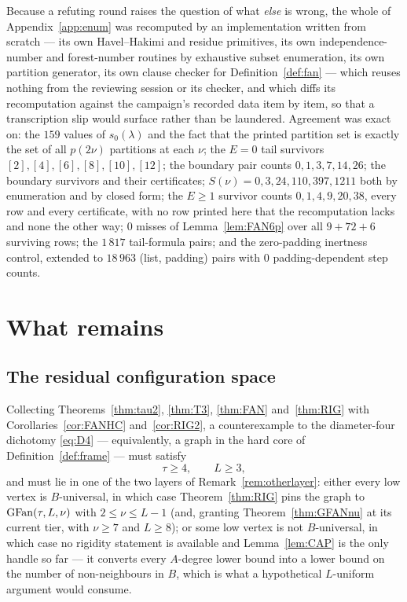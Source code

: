 \begin{remark}\label{rem:thirdtime}
Because a refuting round raises the question of what \emph{else} is wrong, the whole of
Appendix~\ref{app:enum} was recomputed by an implementation written from scratch --- its own
Havel--Hakimi and residue primitives, its own independence-number and forest-number routines
by exhaustive subset enumeration, its own partition generator, its own clause checker for
Definition~\ref{def:fan} --- which reuses nothing from the reviewing session or its checker,
and which diffs its recomputation against the campaign's recorded data item by item, so that
a transcription slip would surface rather than be laundered. Agreement was exact on: the
$159$ values of $s_0(\lambda)$ and the fact that the printed partition set is exactly the
set of all $p(2\nu)$ partitions at each $\nu$; the $E = 0$ tail survivors
$[2],[4],[6],[8],[10],[12]$; the boundary pair counts $0,1,3,7,14,26$; the boundary
survivors and their certificates; $S(\nu) = 0,3,24,110,397,1211$ both by enumeration and by
closed form; the $E \ge 1$ survivor counts $0,1,4,9,20,38$, every row and every certificate,
with no row printed here that the recomputation lacks and none the other way; $0$ misses of
Lemma~\ref{lem:FAN6p} over all $9+72+6$ surviving rows; the $1\,817$ tail-formula pairs; and
the zero-padding inertness control, extended to $18\,963$ (list, padding) pairs with $0$
padding-dependent step counts.
\end{remark}

\section{What remains}\label{sec:open}

\subsection{The residual configuration space}

Collecting Theorems~\ref{thm:tau2}, \ref{thm:T3}, \ref{thm:FAN} and~\ref{thm:RIG} with
Corollaries~\ref{cor:FANHC} and~\ref{cor:RIG2}, a counterexample to the diameter-four
dichotomy \eqref{eq:D4} --- equivalently, a graph in the hard core of
Definition~\ref{def:frame} --- must satisfy
\[
\tau \ge 4, \qquad L \ge 3,
\]
and must lie in one of the two layers of Remark~\ref{rem:otherlayer}: either every low
vertex is $B$-universal, in which case Theorem~\ref{thm:RIG} pins the graph to
$\mathrm{GFan}(\tau,L,\nu)$ with $2 \le \nu \le L-1$ (and, granting Theorem~\ref{thm:GFANnu} at its
current tier, with $\nu \ge 7$ and $L \ge 8$); or some low vertex is not $B$-universal, in
which case no rigidity statement is available and Lemma~\ref{lem:CAP} is the only handle
so far --- it converts every $A$-degree lower bound into a lower bound on the number of
non-neighbours in $B$, which is what a hypothetical $L$-uniform argument would consume.


